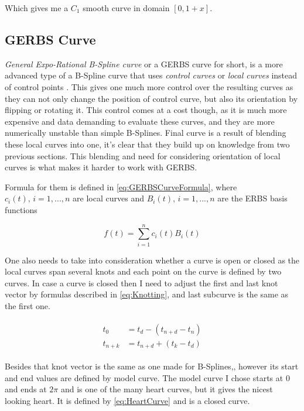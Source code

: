 \documentclass[a4paper,12pt]{extarticle}
\begin{document}
Which gives me a $C_1$ smooth curve in domain $[0,1+x]$.

\subsection{GERBS Curve}
\emph{General Expo-Rational B-Spline curve} or a GERBS curve for short, is a more advanced type of a B-Spline curve that uses \emph{control curves} or \emph{local curves} instead of control points . This gives one much more control over the resulting curves as they can not only change the position of control curve, but also its orientation by flipping or rotating it. This control comes at a cost though, as it is much more expensive and data demanding to evaluate these curves, and they are more numerically unstable than simple B-Splines. Final curve is a result of blending these local curves into one, it's clear that they build up on knowledge from two previous sections. This blending and need for considering orientation of local curves is what makes it harder to work with GERBS.

Formula for them is defined in \cref{eq:GERBSCurveFormula}, where $c_i(t), \, i=1,..., n$ are local curves and $B_i(t), \, i=1,..., n$ are the ERBS basis functions

\begin{equation}
f(t)= \sum_{i=1}^{n} c_i(t) B_i(t)
\label{eq:GERBSCurveFormula}
\end{equation}

One also needs to take into consideration whether a curve is open or closed as the local curves span several knots and each point on the curve is defined by two curves. In case a curve is closed then I need to adjust the first and last knot vector by formulas described in \cref{eq:Knotting}, and last subcurve is the same as the first one.

\begin{align}
\begin{split}
t_0&=t_d-(t_{n+d}-t_n)\\
t_{n+k}&=t_{n+d}+(t_k-t_d)
\label{eq:Knotting}
\end{split}
\end{align}

Besides that knot vector is the same as one made for B-Splines,, however its start and end values are defined by model curve. The model curve I chose starts at $0$ and ends at $2\pi$ and is one of the many heart curves, but it gives the nicest looking heart. It is defined by \cref{eq:HeartCurve} \citep{Weisstein2018} and is a closed curve.
\end{document}
